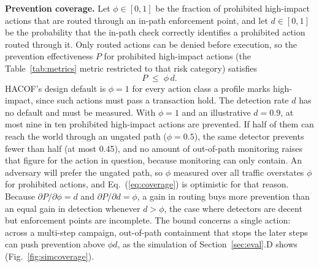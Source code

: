 \documentclass{ieeeaccess}
\newcommand{\hacof}{HACOF}
\begin{document}
\textbf{Prevention coverage.} Let $\phi \in [0,1]$ be the fraction of prohibited high-impact actions that are routed through an in-path enforcement point, and let $d \in [0,1]$ be the probability that the in-path check correctly identifies a prohibited action routed through it. Only routed actions can be denied before execution, so the prevention effectiveness $P$ for prohibited high-impact actions (the Table~\ref{tab:metrics} metric restricted to that risk category) satisfies
\begin{equation}
P \;\le\; \phi \, d .
\label{eq:coverage}
\end{equation}
\hacof's design default is $\phi = 1$ for every action class a profile marks high-impact, since such actions must pass a transaction hold. The detection rate $d$ has no default and must be measured. With $\phi = 1$ and an illustrative $d = 0.9$, at most nine in ten prohibited high-impact actions are prevented. If half of them can reach the world through an ungated path ($\phi = 0.5$), the same detector prevents fewer than half (at most 0.45), and no amount of out-of-path monitoring raises that figure for the action in question, because monitoring can only contain. An adversary will prefer the ungated path, so $\phi$ measured over all traffic overstates $\phi$ for prohibited actions, and Eq.~(\ref{eq:coverage}) is optimistic for that reason. Because $\partial P/\partial\phi = d$ and $\partial P/\partial d = \phi$, a gain in routing buys more prevention than an equal gain in detection whenever $d > \phi$, the case where detectors are decent but enforcement points are incomplete. The bound concerns a single action: across a multi-step campaign, out-of-path containment that stops the later steps can push prevention above $\phi d$, as the simulation of Section~\ref{sec:eval}.D shows (Fig.~\ref{fig:simcoverage}).
\end{document}
